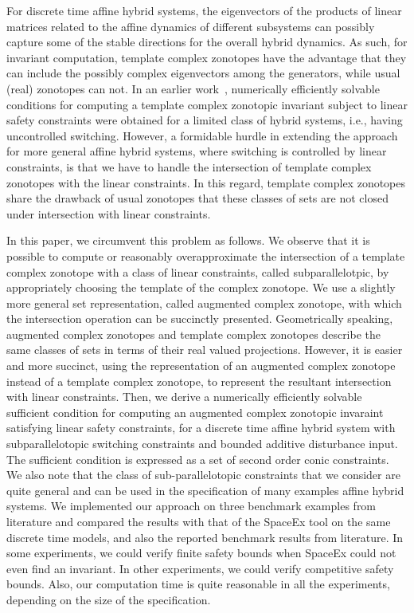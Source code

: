 

For discrete time affine hybrid systems, the eigenvectors of the
products of linear matrices related to the affine dynamics of
different subsystems can possibly capture some of the stable
directions for the overall hybrid dynamics.  As such, for invariant
computation, template complex zonotopes have the advantage that they
can include the possibly complex eigenvectors among the generators,
while usual (real) zonotopes can not.  In an earlier
work~\cite{tcz2017}, numerically efficiently solvable conditions for
computing a template complex zonotopic invariant subject to linear
safety constraints were obtained for a limited class of hybrid
systems, i.e., having uncontrolled switching.  However, a formidable
hurdle in extending the approach for more general affine hybrid
systems, where switching is controlled by linear constraints, is that
we have to handle the intersection of template complex zonotopes with
the linear constraints.  In this regard, template complex zonotopes
share the drawback of usual zonotopes that these classes of sets are
not closed under intersection with linear constraints.

In this paper, we circumvent this problem as follows.  We observe that
it is possible to compute or reasonably overapproximate the
intersection of a template complex zonotope with a class of linear
constraints, called subparallelotpic, by appropriately choosing the
template of the complex zonotope.  We use a slightly more general set
representation, called augmented complex zonotope, with which the
intersection operation can be succinctly presented.  Geometrically
speaking, augmented complex zonotopes and template complex zonotopes
describe the same classes of sets in terms of their real valued
projections.  However, it is easier and more succinct, using the
representation of an augmented complex zonotope instead of a template
complex zonotope, to represent the resultant intersection with linear
constraints.  Then, we derive a numerically efficiently solvable
sufficient condition for computing an augmented complex zonotopic
invaraint satisfying linear safety constraints, for a discrete time
affine hybrid system with subparallelotopic switching constraints and
bounded additive disturbance input.  The sufficient condition is
expressed as a set of second order conic constraints.  We also note
that the class of sub-parallelotopic constraints that we consider are
quite general and can be used in the specification of many examples
affine hybrid systems.  We implemented our approach on three benchmark
examples from literature and compared the results with that of the
SpaceEx tool on the same discrete time models, and also the reported
benchmark results from literature.  In some experiments, we could
verify finite safety bounds when SpaceEx could not even find an
invariant. In other experiments, we could verify competitive safety
bounds.  Also, our computation time is quite reasonable in all the
experiments, depending on the size of the specification.

